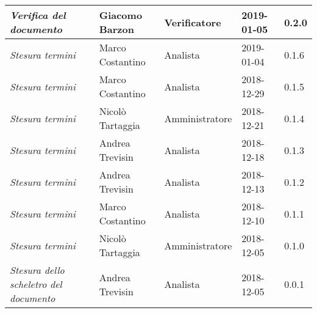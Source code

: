 \begin{longtable}{p{4cm}|C{3cm}|C{3cm}|R{2.5cm}|R{2cm}}
		\emph{Verifica del documento} & Giacomo Barzon & Verificatore & 2019-01-05 & 0.2.0 \\
		\hline
		
		\emph{Stesura termini} & Marco Costantino & Analista & 2019-01-04 & 0.1.6 \\
		\hline
		
		\emph{Stesura termini} & Marco Costantino & Analista & 2018-12-29 & 0.1.5 \\
		\hline
		
		\emph{Stesura termini} & Nicolò Tartaggia & Amministratore & 2018-12-21 & 0.1.4 \\
		\hline
		
		\emph{Stesura termini} & Andrea Trevisin & Analista & 2018-12-18 & 0.1.3 \\
		\hline
		
		\emph{Stesura termini} & Andrea Trevisin & Analista & 2018-12-13 & 0.1.2 \\
		\hline
		
		\emph{Stesura termini} & Marco Costantino & Analista & 2018-12-10 & 0.1.1 \\
		\hline
		
		\emph{Stesura termini} & Nicolò Tartaggia & Amministratore & 2018-12-05 & 0.1.0 \\
		\hline
		
		\emph{Stesura dello scheletro del documento} & Andrea Trevisin & Analista & 2018-12-05 & 0.0.1 \\
		
	\end{longtable}


\clearpage